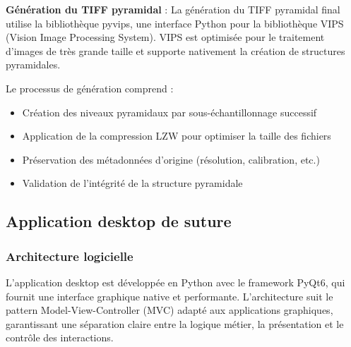 \documentclass[12pt,a4paper]{report}
\begin{document}
\textbf{Génération du TIFF pyramidal} : La génération du TIFF pyramidal final utilise la bibliothèque pyvips, une interface Python pour la bibliothèque VIPS (Vision Image Processing System). VIPS est optimisée pour le traitement d'images de très grande taille et supporte nativement la création de structures pyramidales.

Le processus de génération comprend :
\begin{itemize}
\item Création des niveaux pyramidaux par sous-échantillonnage successif
\item Application de la compression LZW pour optimiser la taille des fichiers
\item Préservation des métadonnées d'origine (résolution, calibration, etc.)
\item Validation de l'intégrité de la structure pyramidale
\end{itemize}

\subsection{Application desktop de suture}

\subsubsection{Architecture logicielle}

L'application desktop est développée en Python avec le framework PyQt6, qui fournit une interface graphique native et performante. L'architecture suit le pattern Model-View-Controller (MVC) adapté aux applications graphiques, garantissant une séparation claire entre la logique métier, la présentation et le contrôle des interactions.
\end{document}
